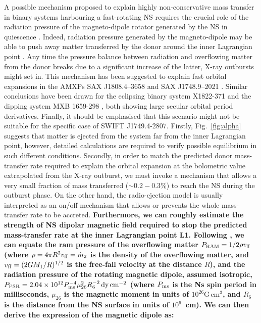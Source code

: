 \documentclass[fleqn,usenatbib]{mnras}
\newcommand{\swiftj}{SWIFT J1749.4-2807}
\begin{document}
A possible mechanism proposed to explain highly non-conservative mass transfer in binary systems harbouring a fast-rotating NS requires the crucial role of the radiation pressure of the magneto-dipole rotator generated by the NS in quiescence \citep[see e.g.,][]{Burderi:2003wk,di-Salvo:2008uu}. Indeed, radiation pressure generated by the magneto-dipole may be able to push away matter transferred by the donor around the inner Lagrangian point \citep[radio-ejection, see e.g.,][for a detailed discussion on the model]{Burderi:2001wp, di-Salvo:2008uu}. Any time the pressure balance between radiation and overflowing matter from the donor breaks due to a significant increase of the latter, X-ray outbursts might set in. This mechanism has been suggested to explain fast orbital expansions in the AMXPs SAX J1808.4–3658 \citep[see e.g.,][]{di-Salvo:2008uu,Burderi:2009td,Sanna:2017vj} and SAX J1748.9–2021 \citep[][]{Sanna:2016ty}. Similar conclusions have been drawn for the eclipsing binary system X1822-371 \citep{Burderi:2010tk,Iaria:2015ut} and the dipping system MXB 1659-298 \citep{Iaria:2018tq}, both showing large secular orbital period derivatives. Finally, it should be emphasised that this scenario might not be suitable for the specific case of \swiftj{}. Firstly, Fig.~\ref{fig:alpha} suggests that matter is ejected from the system far from the inner Lagrangian point, however, detailed calculations are required to verify possible equilibrium in such different conditions. Secondly, in order to match the predicted donor mass-transfer rate required to explain the orbital expansion at the bolometric value extrapolated from the X-ray outburst, we must invoke a mechanism that allows a very small fraction of mass transferred ($\sim0.2-0.3\%$) to reach the NS during the outburst phase. On the other hand, the radio-ejection model is usually interpreted as an on/off mechanism that allows or prevents the whole mass-transfer rate to be accreted. \textbf{Furthermore, we can roughly estimate the strength of NS dipolar magnetic field required to stop the predicted mass-transfer rate at the inner Lagrangian point L1. Following \citet{Burderi:2002wk}, we can equate the ram pressure of the overflowing matter $P_{\rm RAM}=1/2 \rho v_{\rm ff}$ (where $\rho = 4 \pi R^2 v_{\rm ff}=\dot{m}_2$ is the density of the overflowing matter, and $v_{\rm ff}=(2 G M_1/R)^{1/2}$ is the free-fall velocity at the distance $R$), and the radiation pressure of the rotating magnetic dipole, assumed isotropic, $P_{\rm PSR}=2.04\times 10^{12} P^{-4}_{\rm ms}\mu^2_{26}R^{-2}_{6}\,\text{dy}\,\text{cm}^{-2}$ (where $P_{\rm ms}$ is the Ns spin period in milliseconds, $\mu_{26}$ is the magnetic moment in units of $10^{26}\text{G}\,\text{cm}^3$, and $R_{6}$ is the distance from the NS surface in units of $10^{6}$~cm). We can then derive the expression of the magnetic dipole as:
}
\end{document}
